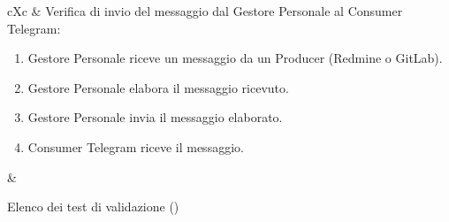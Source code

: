 \begin{table}[H]
\begin{VTtable}[1.7]{\textwidth}{cXc}
        \addtotv & Verifica di invio del messaggio dal Gestore Personale al Consumer Telegram:
        \begin{enumerate}
            \item Gestore Personale riceve un messaggio da un Producer (Redmine o GitLab).
            \item Gestore Personale elabora il messaggio ricevuto.
            \item Gestore Personale invia il messaggio elaborato.
            \item Consumer Telegram riceve il messaggio.
        \end{enumerate}
        & \TNI \\
        \bottomrule
	\end{VTtable}
	\caption{Elenco dei test di validazione (\thetableCounter)}
\end{table}

